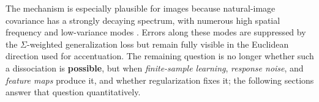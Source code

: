 \documentclass{article}
\theoremstyle{plain}
\theoremstyle{definition}
\theoremstyle{remark}
\begin{document}

The mechanism is especially plausible for images because natural-image covariance has a strongly decaying spectrum, with numerous high spatial frequency and low-variance modes \cite{nat image stats}. 
Errors along these modes are suppressed by the $\Sigma$-weighted generalization loss but remain fully visible in the Euclidean direction used for accentuation.
The remaining question is no longer whether such a dissociation is \textbf{possible}, but when \textit{finite-sample learning}, \textit{response noise}, and \textit{feature maps} produce it, and whether regularization fixes it; the following sections answer that question quantitatively.
\end{document}
